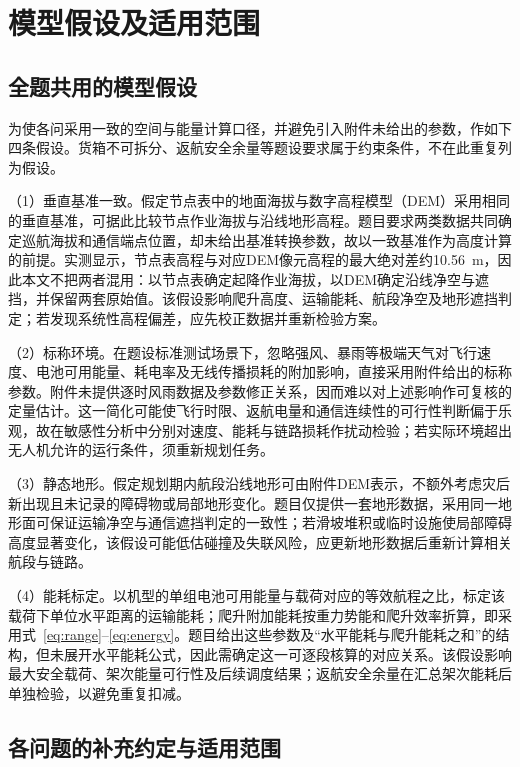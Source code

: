 \section{模型假设及适用范围}

\subsection{全题共用的模型假设}

为使各问采用一致的空间与能量计算口径，并避免引入附件未给出的参数，作如下四条假设。货箱不可拆分、返航安全余量等题设要求属于约束条件，不在此重复列为假设。

（1）垂直基准一致。假定节点表中的地面海拔与数字高程模型（DEM）采用相同的垂直基准，可据此比较节点作业海拔与沿线地形高程。题目要求两类数据共同确定巡航海拔和通信端点位置，却未给出基准转换参数，故以一致基准作为高度计算的前提。实测显示，节点表高程与对应DEM像元高程的最大绝对差约10.56~m，因此本文不把两者混用：以节点表确定起降作业海拔，以DEM确定沿线净空与遮挡，并保留两套原始值。该假设影响爬升高度、运输能耗、航段净空及地形遮挡判定；若发现系统性高程偏差，应先校正数据并重新检验方案。

（2）标称环境。在题设标准测试场景下，忽略强风、暴雨等极端天气对飞行速度、电池可用能量、耗电率及无线传播损耗的附加影响，直接采用附件给出的标称参数。附件未提供逐时风雨数据及参数修正关系，因而难以对上述影响作可复核的定量估计。这一简化可能使飞行时限、返航电量和通信连续性的可行性判断偏于乐观，故在敏感性分析中分别对速度、能耗与链路损耗作扰动检验；若实际环境超出无人机允许的运行条件，须重新规划任务。

（3）静态地形。假定规划期内航段沿线地形可由附件DEM表示，不额外考虑灾后新出现且未记录的障碍物或局部地形变化。题目仅提供一套地形数据，采用同一地形面可保证运输净空与通信遮挡判定的一致性；若滑坡堆积或临时设施使局部障碍高度显著变化，该假设可能低估碰撞及失联风险，应更新地形数据后重新计算相关航段与链路。

（4）能耗标定。以机型的单组电池可用能量与载荷对应的等效航程之比，标定该载荷下单位水平距离的运输能耗；爬升附加能耗按重力势能和爬升效率折算，即采用式~\eqref{eq:range}--\eqref{eq:energy}。题目给出这些参数及“水平能耗与爬升能耗之和”的结构，但未展开水平能耗公式，因此需确定这一可逐段核算的对应关系。该假设影响最大安全载荷、架次能量可行性及后续调度结果；返航安全余量在汇总架次能耗后单独检验，以避免重复扣减。

\subsection{各问题的补充约定与适用范围}


